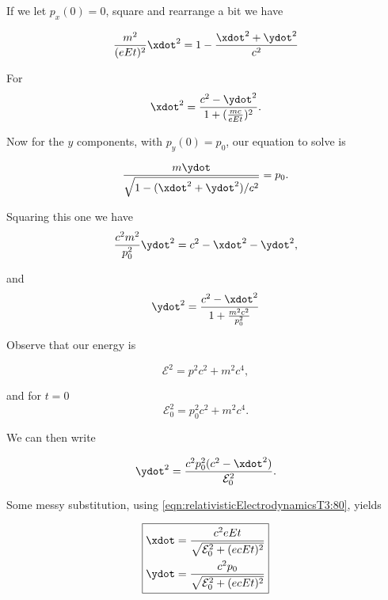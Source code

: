 If we let $p_x(0) = 0$, square and rearrange a bit we have

\begin{equation}\label{eqn:relativisticElectrodynamicsT3:70}
\frac{m^2}{(e E t)^2} \xdot^2 = 1 - \frac{\xdot^2 + \ydot^2}{c^2}
\end{equation}

For
\begin{equation}\label{eqn:relativisticElectrodynamicsT3:80}
\xdot^2 = \frac{c^2 - \ydot^2}{1 + (\frac{mc}{eEt})^2}.
\end{equation}

Now for the $y$ components, with $p_y(0) = p_0$, our equation to solve is

\begin{equation}\label{eqn:relativisticElectrodynamicsT3:82}
\frac{m \ydot}{\sqrt{1 - (\xdot^2 + \ydot^2)/c^2}} = p_0.
\end{equation}

Squaring this one we have
\begin{equation}\label{eqn:relativisticElectrodynamicsT3:84}
\frac{c^2 m^2}{p_0^2} \ydot^2 = c^2 - \xdot^2 - \ydot^2 ,
\end{equation}

and
\begin{equation}\label{eqn:relativisticElectrodynamicsT3:86}
\ydot^2 = \frac{ c^2 - \xdot^2}{1 + \frac{m^2 c^2}{p_0^2}}
\end{equation}

Observe that our energy is

\begin{equation}\label{eqn:relativisticElectrodynamicsT3:100}
\mathcal{E}^2 = p^2 c^2 + m^2 c^4,
\end{equation}

and for $t=0$
\begin{equation}\label{eqn:relativisticElectrodynamicsT3:100b}
\mathcal{E}_0^2 = p_0^2 c^2 + m^2 c^4.
\end{equation}

We can then write

\begin{equation}\label{eqn:relativisticElectrodynamicsT3:120}
\ydot^2 = \frac{ c^2 p_0^2 (c^2 - \xdot^2)}{ \mathcal{E}_0^2 }.
\end{equation}

Some messy substitution, using \ref{eqn:relativisticElectrodynamicsT3:80}, yields

\begin{equation}\label{eqn:relativisticElectrodynamicsT3:140}
\boxed{
\begin{aligned}
\xdot &= \frac{c^2 e E t}{\sqrt{ \mathcal{E}_0^2 + (e c E t)^2 }} \\
\ydot &= \frac{c^2 p_0 }{\sqrt{ \mathcal{E}_0^2 + (e c E t)^2 }}
\end{aligned}
}
\end{equation}


